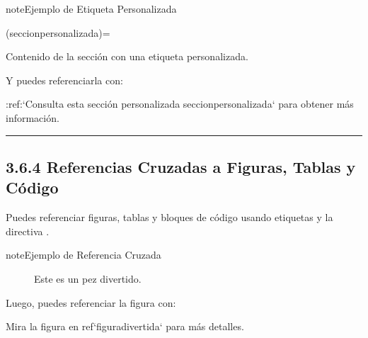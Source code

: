 \documentclass[a4paper,10pt,spanish]{sphinxmanual}
\begin{document}
\begin{sphinxadmonition}{note}{Ejemplo de Etiqueta Personalizada}

\begin{sphinxVerbatim}[commandchars=\\\{\}]
(seccion\PYGZhy{}personalizada)=

Contenido de la sección con una etiqueta personalizada.
\end{sphinxVerbatim}

\sphinxAtStartPar
Y puedes referenciarla con:

\begin{sphinxVerbatim}[commandchars=\\\{\}]
:ref:`Consulta esta sección personalizada \PYGZlt{}seccion\PYGZhy{}personalizada\PYGZgt{}` para obtener más información.
\end{sphinxVerbatim}
\end{sphinxadmonition}


\bigskip\hrule\bigskip



\subsection{3.6.4 Referencias Cruzadas a Figuras, Tablas y Código}
\label{\detokenize{3_guia_myst/cross_references:referencias-cruzadas-a-figuras-tablas-y-codigo}}
\sphinxAtStartPar
Puedes referenciar figuras, tablas y bloques de código usando etiquetas y la directiva .

\begin{sphinxadmonition}{note}{Ejemplo de Referencia Cruzada}

\begin{figure}[H]
\centering
\capstart

\noindent{}
\caption{Este es un pez divertido.}\label{\detokenize{3_guia_myst/cross_references:figura-divertida}}\end{figure}

\sphinxAtStartPar
Luego, puedes referenciar la figura con:

\begin{sphinxVerbatim}[commandchars=\\\{\}]
Mira la figura en \PYGZob{}ref\PYGZcb{}`figura\PYGZhy{}divertida` para más detalles.
\end{sphinxVerbatim}
\end{sphinxadmonition}
\end{document}
